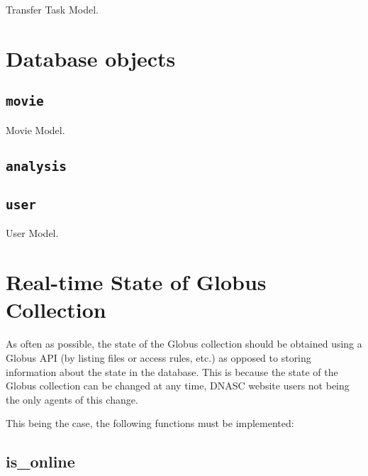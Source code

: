 \begin{table}[h] %
    
    \caption{Transfer Task Model.}
\end{table}

\section{Database objects}

\subsection{\texttt{movie}}
\begin{table}[h] %
    
    \caption{Movie Model.}
\end{table}

\subsection{\texttt{analysis}}

\subsection{\texttt{user}}

\begin{table}[h] %
    
    \caption{User Model.}
\end{table}

\section{Real-time State of Globus Collection}

As often as possible, the state of the Globus collection should be obtained using a Globus API 
(by listing files or access rules, etc.) as opposed to storing information about the state in 
the database. This is because the state of the Globus collection can be changed at any time, 
DNASC website users not being the only agents of this change.

This being the case, the following functions must be implemented:

\subsection{is\_online}

